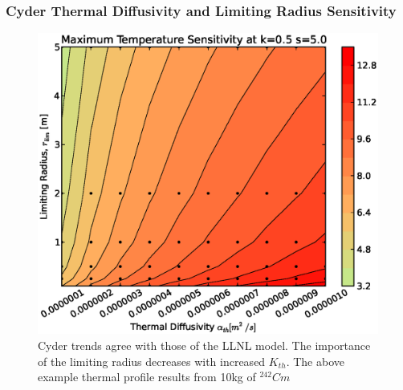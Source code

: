 \begin{frame}[ctb!]
\frametitle{Cyder Thermal Diffusivity and Limiting Radius Sensitivity}
\begin{figure}[htbp!]
\begin{center}
\includegraphics[height=0.7\textheight]{./thermal_demonstration/diffusivity/ar.eps}
\end{center}
\caption[$\alpha_{th}$ vs. $r_{lim}$ Sensitivity in Cyder]
{Cyder trends agree with 
those of the LLNL model. The importance of the limiting radius decreases with 
increased $K_{th}$. The above example thermal profile results from 10kg of 
$^{242}Cm$}
\label{fig:ak}
\end{figure}
\end{frame}
